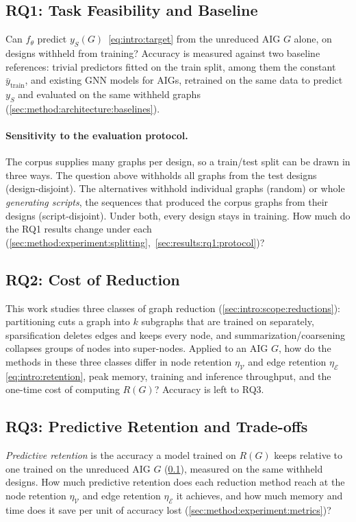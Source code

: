 \subsection{RQ1: Task Feasibility and Baseline}
\label{sec:intro:rq1}
Can $f_\theta$ predict $y_S(G)$~\eqref{eq:intro:target} from the unreduced AIG $G$ alone, on
designs withheld from training? Accuracy is measured against two baseline references: trivial
predictors fitted on the train split, among them the constant $\bar{y}_{\text{train}}$,
and existing GNN models for AIGs, retrained on the same data to predict $y_S$ and
evaluated on the same withheld graphs (\ref{sec:method:architecture:baselines}).

\paragraph{Sensitivity to the evaluation protocol.}
The corpus supplies many graphs per design, so a train/test split can be drawn in three ways.
The question above withholds all graphs from the test designs (design-disjoint). The
alternatives withhold individual graphs (random) or whole \emph{generating scripts}, the
sequences that produced the corpus graphs from their designs (script-disjoint). Under both,
every design stays in training. How much do the RQ1 results change under each
(\ref{sec:method:experiment:splitting},~\ref{sec:results:rq1:protocol})?

\subsection{RQ2: Cost of Reduction}
\label{sec:intro:rq2}
This work studies three classes of graph reduction (\ref{sec:intro:scope:reductions}):
partitioning cuts a graph into $k$ subgraphs that are trained on separately, sparsification
deletes edges and keeps every node, and summarization/coarsening collapses groups of nodes
into super-nodes. Applied to an AIG $G$, how do the methods in these three classes differ in
node retention $\eta_{\mathcal{V}}$ and edge retention $\eta_{\mathcal{E}}$
\eqref{eq:intro:retention}, peak memory, training and inference throughput, and the one-time
cost of computing $R(G)$? Accuracy is left to RQ3.

\subsection{RQ3: Predictive Retention and Trade-offs}
\label{sec:intro:rq3}
\emph{Predictive retention} is the accuracy a model trained on $R(G)$ keeps relative to one
trained on the unreduced AIG $G$ (\ref{sec:intro:rq1}), measured on the same withheld
designs. How much predictive retention does each reduction method reach at the node retention
$\eta_{\mathcal{V}}$ and edge retention $\eta_{\mathcal{E}}$ it achieves, and how much memory
and time does it save per unit of accuracy lost (\ref{sec:method:experiment:metrics})?


